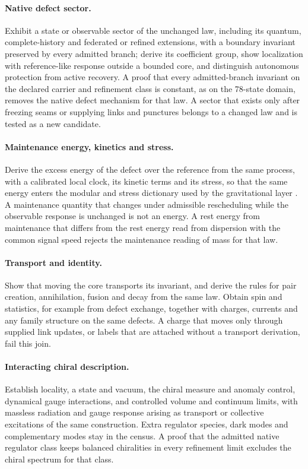 \documentclass[11pt]{article}
\begin{document}
\paragraph{Native defect sector.}
Exhibit a state or observable sector of the unchanged law, including its
quantum, complete-history and federated or refined extensions, with a
boundary invariant preserved by every admitted branch; derive its coefficient
group, show localization with reference-like response outside a bounded
core, and distinguish autonomous protection from active recovery. A proof
that every admitted-branch invariant on the declared carrier and refinement
class is constant, as on the 78-state domain, removes the native defect
mechanism for that law. A sector that exists only after freezing seams or
supplying links and punctures belongs to a changed law and is tested as a
new candidate.

\paragraph{Maintenance energy, kinetics and stress.}
Derive the excess energy of the defect over the reference from the same
process, with a calibrated local clock, its kinetic terms and its stress, so
that the same energy enters the modular and stress dictionary used by the
gravitational layer \cite{ophEinstein}. A maintenance quantity that changes
under admissible rescheduling while the observable response is unchanged is
not an energy. A rest energy from maintenance that differs from the rest
energy read from dispersion with the common signal speed rejects the
maintenance reading of mass for that law.

\paragraph{Transport and identity.}
Show that moving the core transports its invariant, and derive the rules for
pair creation, annihilation, fusion and decay from the same law. Obtain spin
and statistics, for example from defect exchange, together with charges,
currents and any family structure on the same defects. A charge that moves
only through supplied link updates, or labels that are attached without a
transport derivation, fail this join.

\paragraph{Interacting chiral description.}
Establish locality, a state and vacuum, the chiral measure and anomaly
control, dynamical gauge interactions, and controlled volume and continuum
limits, with massless radiation and gauge response arising as transport or
collective excitations of the same construction. Extra regulator species,
dark modes and complementary modes stay in the census. A proof that the
admitted native regulator class keeps balanced chiralities in every refinement
limit excludes the chiral spectrum for that class.
\end{document}
